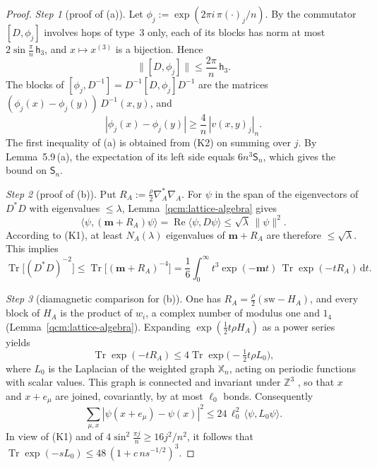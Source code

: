 \documentclass[11pt,letterpaper,reqno]{amsart}
\theoremstyle{definition}
\begin{document}
\begin{proof}
\emph{Step 1} (proof of (a)).
Let $\phi_j:=\exp(2\pi i\,\pi(\cdot)_j/n)$.
By \cite[Proposition~2.1]{QEDConstruction} the commutator $[D,\phi_j]$ involves hops of type~$3$ only, each of its blocks has norm at most $2\sin\frac\pi n\,\mathsf h_3$, and $x\mapsto x^{(3)}$ is a bijection.
Hence
\begin{equation*}
\|[D,\phi_j]\|\le\frac{2\pi}{n}\,\mathsf h_3.
\end{equation*}
The blocks of $[\phi_j,D^{-1}]=D^{-1}[D,\phi_j]D^{-1}$ are the matrices $(\phi_j(x)-\phi_j(y))\,D^{-1}(x,y)$, and
\begin{equation*}
|\phi_j(x)-\phi_j(y)|\ge\frac4n\,|v(x,y)_j|_n.
\end{equation*}
The first inequality of (a) is obtained from (K2) on summing over $j$.
By Lemma~5.9\,(a), the expectation of its left side equals $6n^3\mathsf S_n$, which gives the bound on $\mathsf S_n$.

\emph{Step 2} (proof of (b)).
Put $R_A:=\frac\rho2\nabla_A^*\nabla_A$.
For $\psi$ in the span of the eigenvectors of $D^*D$ with eigenvalues $\le\lambda$, Lemma~\ref{qcm:lattice-algebra} gives
\begin{equation*}
\langle\psi,(\mathbf m+R_A)\psi\rangle=\operatorname{Re}\langle\psi,D\psi\rangle\le\sqrt\lambda\,\|\psi\|^2.
\end{equation*}
According to (K1), at least $N_A(\lambda)$ eigenvalues of $\mathbf m+R_A$ are therefore $\le\sqrt\lambda$.
This implies
\begin{equation*}
\operatorname{Tr}\bigl[(D^*D)^{-2}\bigr]\le\operatorname{Tr}\bigl[(\mathbf m+R_A)^{-4}\bigr]=\frac16\int_0^\infty t^3\exp(-\mathbf mt)\,\operatorname{Tr}\exp(-tR_A)\,\mathrm dt.
\end{equation*}

\emph{Step 3} (diamagnetic comparison for (b)).
One has $R_A=\frac\rho2(\mathrm{sw}-H_A)$, and every block of $H_A$ is the product of $w_i$, a complex number of modulus one and $1_4$ (Lemma~\ref{qcm:lattice-algebra}).
Expanding $\exp(\frac12t\rho H_A)$ as a power series yields
\begin{equation*}
\operatorname{Tr}\exp(-tR_A)\le4\operatorname{Tr}\exp\bigl(-\tfrac12t\rho L_0\bigr),
\end{equation*}
where $L_0$ is the Laplacian of the weighted graph $\mathbb X_n$, acting on periodic functions with scalar values.
This graph is connected and invariant under $\mathbb Z^3$ \cite[Proposition~2.1]{QEDConstruction}, so that $x$ and $x+e_\mu$ are joined, covariantly, by at most $\ell_0$ bonds.
Consequently
\begin{equation*}
\sum_{\mu,x}|\psi(x+e_\mu)-\psi(x)|^2\le24\,\ell_0^2\,\langle\psi,L_0\psi\rangle.
\end{equation*}
In view of (K1) and of $4\sin^2\frac{\pi j}{n}\ge16j^2/n^2$, it follows that $\operatorname{Tr}\exp(-sL_0)\le48\,(1+c\,ns^{-1/2})^3$.


\end{proof}
\end{document}
